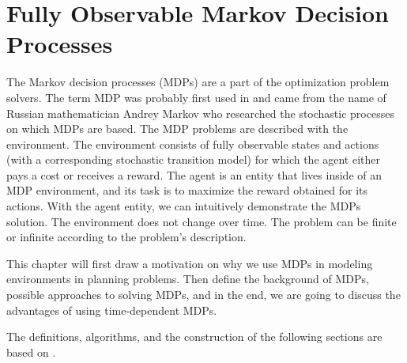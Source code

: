 
\chapter{Fully Observable Markov Decision Processes}

The Markov decision processes (MDPs) are a part of the optimization problem solvers. The term MDP was probably first used in \cite{cite:1} and came from the name of Russian mathematician Andrey Markov who researched the stochastic processes on which MDPs are based. The MDP problems are described with the environment. The environment consists of fully observable states and actions (with a corresponding stochastic transition model) for which the agent either pays a cost or receives a reward. The agent is an entity that lives inside of an MDP environment, and its task is to maximize the reward obtained for its actions. With the agent entity, we can intuitively demonstrate the MDPs solution. The environment does not change over time. The problem can be finite or infinite according to the problem's description.

This chapter will first draw a motivation on why we use MDPs in modeling environments in planning problems. Then define the background of MDPs, possible approaches to solving MDPs, and in the end, we are going to discuss the advantages of using time-dependent MDPs.

The definitions, algorithms, and the construction of the following sections are based on \cite{Kolobov2012}. 





